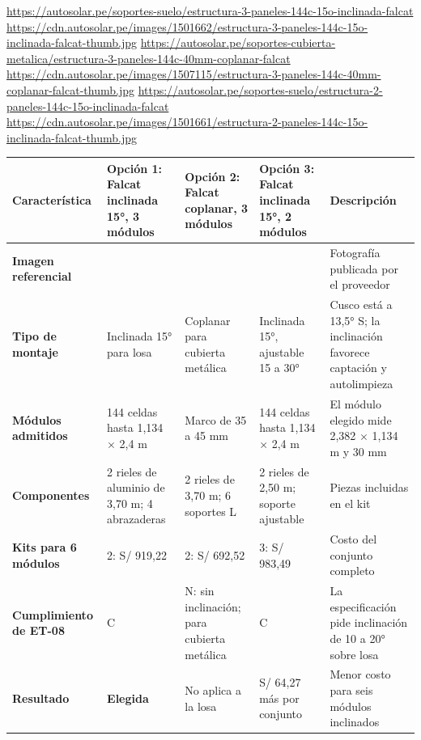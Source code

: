 \begin{landscape}
\urldef{\cotuq}\url{https://autosolar.pe/soportes-suelo/estructura-3-paneles-144c-15o-inclinada-falcat}
\urldef{\cotur}\url{https://cdn.autosolar.pe/images/1501662/estructura-3-paneles-144c-15o-inclinada-falcat-thumb.jpg}
\urldef{\cotus}\url{https://autosolar.pe/soportes-cubierta-metalica/estructura-3-paneles-144c-40mm-coplanar-falcat}
\urldef{\cotut}\url{https://cdn.autosolar.pe/images/1507115/estructura-3-paneles-144c-40mm-coplanar-falcat-thumb.jpg}
\urldef{\cotuu}\url{https://autosolar.pe/soportes-suelo/estructura-2-paneles-144c-15o-inclinada-falcat}
\urldef{\cotuv}\url{https://cdn.autosolar.pe/images/1501661/estructura-2-paneles-144c-15o-inclinada-falcat-thumb.jpg}
\par\noindent\begin{minipage}{\linewidth}\formatofichas
{}\label{tab:cot-est}
\begin{tabularx}{\linewidth}{@{}>{\raggedright\arraybackslash}p{3.0cm}YYY>{\raggedright\arraybackslash}p{4.4cm}@{}}
\toprule
\textbf{Característica} & \textbf{Opción 1: Falcat inclinada 15°, 3 módulos} & \textbf{Opción 2: Falcat coplanar, 3 módulos} & \textbf{Opción 3: Falcat inclinada 15°, 2 módulos} & \textbf{Descripción}\\\midrule
\textbf{Imagen referencial} &  &  &  & Fotografía publicada por el proveedor\\
\textbf{Tipo de montaje} & Inclinada 15° para losa & Coplanar para cubierta metálica & Inclinada 15°, ajustable 15 a 30° & Cusco está a 13,5° S; la inclinación favorece captación y autolimpieza\\
\textbf{Módulos admitidos} & 144 celdas hasta 1,134 $\times$ 2,4 m & Marco de 35 a 45 mm & 144 celdas hasta 1,134 $\times$ 2,4 m & El módulo elegido mide 2,382 $\times$ 1,134 m y 30 mm\\
\textbf{Componentes} & 2 rieles de aluminio de 3,70 m; 4 abrazaderas & 2 rieles de 3,70 m; 6 soportes L & 2 rieles de 2,50 m; soporte ajustable & Piezas incluidas en el kit\\
\textbf{Kits para 6 módulos} & 2: S/ 919,22 & 2: S/ 692,52 & 3: S/ 983,49 & Costo del conjunto completo\\
\textbf{Cumplimiento de ET-08} & C & N: sin inclinación; para cubierta metálica & C & La especificación pide inclinación de 10 a 20° sobre losa\\
\textbf{Resultado} & \textbf{Elegida} & No aplica a la losa & S/ 64,27 más por conjunto & Menor costo para seis módulos inclinados\\

\end{tabularx}
\end{minipage}
\end{landscape}
